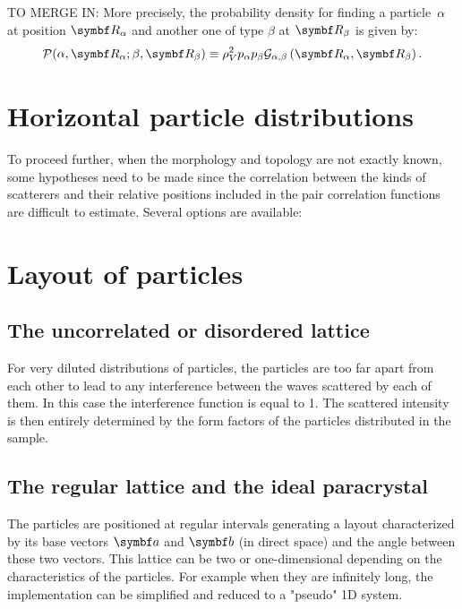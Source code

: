 TO MERGE IN:
More precisely, the probability density for finding a particle~$\alpha$
at position $\v{R}_\alpha$ and another one of type $\beta$ at $\v{R}_\beta$ is given by:
\begin{equation*}
  \mathcal{P}(\alpha, \v{R}_\alpha ; \beta , \v{R}_\beta ) \equiv \rho_V^2 p_\alpha p_\beta \ppcf{\alpha}{\beta}{R}.
\end{equation*}


\section{Horizontal particle distributions}

To proceed further, when the morphology and topology are not exactly known,
some hypotheses need to be made since the correlation between the kinds of scatterers
and their relative positions included in the pair correlation functions are difficult to estimate.
Several options are available:



\section{Layout of particles}\label{sec:partlayout}

\subsection{The uncorrelated or disordered lattice}
For very diluted distributions of particles, the particles are too far apart from each other to lead to any interference between the waves scattered by each of them. In this case the interference function is equal to 1. The scattered intensity is then entirely determined by the form factors of the particles distributed in the sample.

\subsection{The regular lattice and the ideal paracrystal}
The particles are positioned at regular intervals generating a layout characterized by its base vectors $\v{a}$ and $\v{b}$ (in direct space) and the angle between these two vectors.
This lattice can be two or one-dimensional depending on the characteristics of the particles. For example when they are infinitely long, the implementation can be simplified and reduced to a "pseudo" 1D system.

